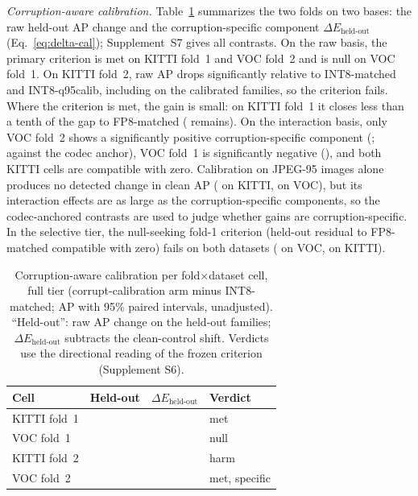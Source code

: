 \documentclass[a4paper,fleqn]{cas-dc}
\begin{document}
\emph{Corruption-aware calibration.} Table~\ref{tab:intervention-summary} summarizes the two folds on two bases: the raw held-out AP change and the corruption-specific component $\Delta E_{\text{held-out}}$ (Eq.~\eqref{eq:delta-cal}); Supplement~S7 gives all contrasts. On the raw basis, the primary criterion is met on KITTI fold~1 and VOC fold~2 and is null on VOC fold~1. On KITTI fold~2, raw AP drops significantly relative to INT8-matched and INT8-q95calib, including on the calibrated families, so the criterion fails. Where the criterion is met, the gain is small: on KITTI fold~1 it closes less than a tenth of the gap to FP8-matched (\nnCcFHKitti{} remains). On the interaction basis, only VOC fold~2 shows a significantly positive corruption-specific component (\nnCtDHVoc{}; \nnCtQDHVoc{} against the codec anchor), VOC fold~1 is significantly negative (\nnCcDHVoc{}), and both KITTI cells are compatible with zero. Calibration on JPEG-95 images alone produces no detected change in clean AP (\nnQqJKitti{} on KITTI, \nnQqJVoc{} on VOC), but its interaction effects are as large as the corruption-specific components, so the codec-anchored contrasts are used to judge whether gains are corruption-specific. In the selective tier, the null-seeking fold-1 criterion (held-out residual to FP8-matched compatible with zero) fails on both datasets (\nnSccFHVoc{} on VOC, \nnSccFHKitti{} on KITTI).

\begin{table}[t]
\centering
\caption{Corruption-aware calibration per fold$\times$dataset cell, full tier (corrupt-calibration arm minus INT8-matched; AP with 95\% paired intervals, unadjusted). ``Held-out'': raw AP change on the held-out families; $\Delta E_{\text{held-out}}$ subtracts the clean-control shift. Verdicts use the directional reading of the frozen criterion (Supplement S6).}
\label{tab:intervention-summary}
\scriptsize
\setlength{\tabcolsep}{2.5pt}
\begin{tabular}{@{}llll@{}}
\toprule
Cell & Held-out & $\Delta E_{\text{held-out}}$ & Verdict \\
\midrule
KITTI fold~1 & \nnCcHKitti{} & \nnCcDHKitti{} & met \\
VOC fold~1 & \nnCcHVoc{} & \nnCcDHVoc{} & null \\
KITTI fold~2 & \nnCtHKitti{} & \nnCtDHKitti{} & harm \\
VOC fold~2 & \nnCtHVoc{} & \nnCtDHVoc{} & met, specific \\
\bottomrule
\end{tabular}
\end{table}
\end{document}
